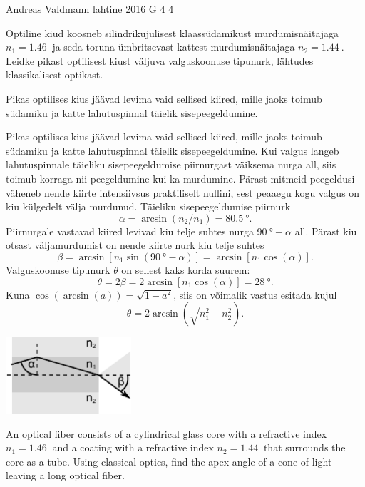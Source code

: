 {Andreas Valdmann} %
{lahtine} %
{2016} %
{G 4} %
{4} %
{
\ifStatement
Optiline kiud koosneb silindrikujulisest klaassüdamikust murdumisnäitajaga $n_1=\SI{1,46}{}$ ja seda toruna ümbritsevast kattest murdumisnäitajaga $n_2=\SI{1,44}{}$. Leidke pikast optilisest kiust väljuva valguskoonuse tipunurk, lähtudes klassikalisest optikast.
\fi


\ifHint
Pikas optilises kius jäävad levima vaid sellised kiired, mille jaoks toimub südamiku ja katte lahutuspinnal täielik sisepeegeldumine.
\fi


\ifSolution
Pikas optilises kius jäävad levima vaid sellised kiired, mille jaoks toimub südamiku ja katte lahutuspinnal täielik sisepeegeldumine. Kui valgus langeb lahutuspinnale täieliku sisepeegeldumise piirnurgast väiksema nurga all, siis toimub korraga nii peegeldumine kui ka murdumine. Pärast mitmeid peegeldusi väheneb nende kiirte intensiivsus praktiliselt nullini, sest peaaegu kogu valgus on kiu külgedelt välja murdunud. Täieliku sisepeegeldumise piirnurk 
\[
\alpha=\arcsin(n_2/n_1)=\SI{80,5}{\degree}.
\]
Piirnurgale vastavad kiired levivad kiu telje suhtes nurga $\SI{90}{\degree}-\alpha$ all. Pärast kiu otsast väljamurdumist on nende kiirte nurk kiu telje suhtes 
\[
\beta=\arcsin[n_1\sin(\SI{90}{\degree}-\alpha)]=\arcsin[n_1\cos(\alpha)].
\]
Valguskoonuse tipunurk $\theta$ on sellest kaks korda suurem: 
\[
\theta=2\beta=2\arcsin[n_1\cos(\alpha)]=\SI{28}{\degree}.
\]
Kuna $\cos(\arcsin(a))=\sqrt{1-a^2}$, siis on võimalik vastus esitada kujul 
\[
\theta=2\arcsin(\sqrt{n_1^2-n_2^2}).
\]

\begin{center}
 \includegraphics[width=0.35\textwidth]{2016-lahg-04-kiud}
\end{center}
\fi


\ifEngStatement
An optical fiber consists of a cylindrical glass core with a refractive index $n_1=\SI{1,46}{}$ and a coating with a refractive index $n_2=\SI{1,44}{}$ that surrounds the core as a tube. Using classical optics, find the apex angle of a cone of light leaving a long optical fiber.
\fi


}
